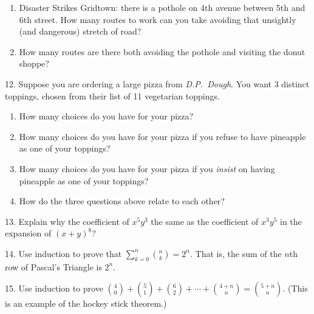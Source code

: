 \documentclass[12pt,]{book}
\theoremstyle{plain}
\theoremstyle{definition}
\theoremstyle{definition}
\theoremstyle{definition}
\numberwithin{equation}{chapter}
\renewcommand{\d}{\displaystyle}
\begin{document}
\begin{exerciselist}
\begin{enumerate}[label=(\alph*)]
\item\hypertarget{li-428}{}\hypertarget{p-909}{}%
Disaster Strikes Gridtown: there is a pothole on 4th avenue between 5th and 6th street. How many routes to work can you take avoiding that unsightly (and dangerous) stretch of road? %
\item\hypertarget{li-429}{}\hypertarget{p-910}{}%
How many routes are there both avoiding the pothole and visiting the donut shoppe? %
\end{enumerate}
%
\par\smallskip
\item[12.]\hypertarget{exercise-113}{}\hypertarget{p-911}{}%
Suppose you are ordering a large pizza from \emph{D.P.~Dough}. You want 3 distinct toppings, chosen from their list of 11 vegetarian toppings. \leavevmode%
\begin{enumerate}[label=(\alph*)]
\item\hypertarget{li-430}{}\hypertarget{p-912}{}%
How many choices do you have for your pizza?%
\item\hypertarget{li-431}{}\hypertarget{p-913}{}%
How many choices do you have for your pizza if you refuse to have pineapple as one of your toppings?%
\item\hypertarget{li-432}{}\hypertarget{p-914}{}%
How many choices do you have for your pizza if you \emph{insist} on having pineapple as one of your toppings?%
\item\hypertarget{li-433}{}\hypertarget{p-915}{}%
How do the three questions above relate to each other?%
\end{enumerate}
%
\par\smallskip
\item[13.]\hypertarget{exercise-114}{}\hypertarget{p-916}{}%
Explain why the coefficient of \(x^5y^3\) the same as the coefficient of \(x^3y^5\) in the expansion of \((x+y)^8\)?%
\par\smallskip
\item[14.]\hypertarget{exercise-115}{}\hypertarget{p-917}{}%
Use induction to prove that \(\d\sum_{k=0}^n {n \choose k} = 2^n\). That is, the sum of the \(n\)th row of Pascal's Triangle is \(2^n\).%
\par\smallskip
\item[15.]\hypertarget{exercise-116}{}\hypertarget{p-918}{}%
Use induction to prove \({4 \choose 0} + {5 \choose 1} + {6 \choose 2} + \cdots + {4+n \choose n} = {5+n \choose n}\). (This is an example of the hockey stick theorem.)%
\par\smallskip
\end{exerciselist}
\typeout{************************************************}
\typeout{************************************************}
\end{document}
